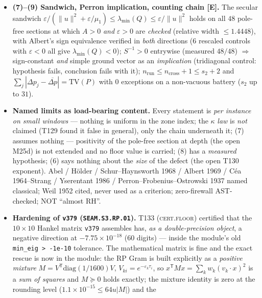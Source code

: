 \documentclass[11pt]{article}
\providecommand{\mE}{\textbf{[E]}}\providecommand{\mC}{\textbf{[C]}}
\begin{document}
\begin{itemize}[leftmargin=1.5em]
$43$ grids ($2.1\times10^{-14}$) with a PSD defect on every grid, so the compression error is
one-sided \emph{by} the identity (controls: unnormalised merge weights $8.4\times10^{-1}$; dropping
the $-B$ term in $R$ $4.0\times10^{-1}$).
\item \textbf{(7)--(9) Sandwich, Perron implication, counting chain \mE.} The secular sandwich
$\varepsilon/(\|u\|^2+\varepsilon/\mu_1)\le\lambda_{\min}(Q)\le\varepsilon/\|u\|^2$ holds on all
$48$ pole-free sections at which $A>0$ \emph{and} $\varepsilon>0$ are \emph{checked} (relative width
$\le1.4448$), with Albert's sign equivalence verified in \emph{both} directions ($6$ rescaled
controls with $\varepsilon<0$ all give $\lambda_{\min}(Q)<0$); $S^{-1}>0$ entrywise (measured
$48/48$) $\Rightarrow$ sign-constant \emph{and} simple ground vector as an \emph{implication}
(tridiagonal control: hypothesis fails, conclusion fails with it);
$n_{\mathrm{run}}\le n_{\mathrm{cross}}+1\le s_2+2$ and $\sum_j|\Delta p_j-\overline{\Delta p}|=\mathrm{TV}(P)$
with $0$ exceptions on a non-vacuous battery ($s_2$ up to $31$).
\item \textbf{Named limits as load-bearing content.} Every statement is \emph{per instance on small
windows} --- nothing is uniform in the zone index; the $\kappa$ \emph{law} is \emph{not} claimed
(T129 found it false in general), only the chain underneath it; (7) assumes nothing --- positivity
of the pole-free section at depth (the open M25d) is not extended and no floor value is carried;
(8) has a \emph{measured} hypothesis; (6) says nothing about the \emph{size} of the defect (the open
T130 exponent). Abel / H\"older / Schur--Haynsworth 1968 / Albert 1969 / C\'ea 1964--Strang /
Yserentant 1986 / Perron--Frobenius--Ostrowski 1937 named classical; Weil 1952 cited, never used as
a criterion; zero-firewall AST-checked; NOT ``almost RH''.
\item \textbf{Hardening of \texttt{v379} (\texttt{SEAM.S3.RP.01}).} T133 (\textsc{cert.floor})
certified that the $10\times10$ Hankel matrix \texttt{v379} assembles has, \emph{as a
double-precision object}, a negative direction at $-7.75\times10^{-18}$ ($60$ digits) --- inside the
module's old \texttt{min\_eig > -1e-10} tolerance. The mathematical matrix is fine and the exact
rescue is now in the module: the RP Gram is built explicitly as a \emph{positive mixture}
$M=V^{\mathsf T}\mathrm{diag}(1/1600)V$, $V_{ki}=e^{-\varepsilon_k\tau_i}$, so
$x^{\mathsf T}Mx=\sum_k w_k(v_k\!\cdot\!x)^2$ is a \emph{sum of squares} and $M\succeq0$ holds
exactly; the mixture identity is zero at the rounding level ($1.1\times10^{-15}\le64u|M|$) and the

\end{itemize}
\end{document}
